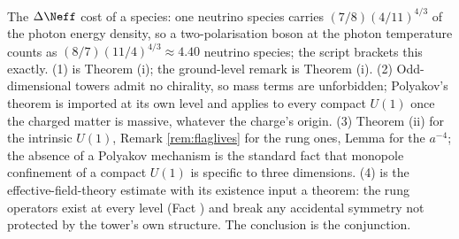 The $\Delta\Neff$ cost of a species: one neutrino species carries $(7/8)(4/11)^{4/3}$ of the photon energy density, so a two-polarisation boson at the photon temperature counts as $(8/7)(11/4)^{4/3} \approx 4.40$ neutrino species; the script brackets this exactly. (1) is Theorem (i); the ground-level remark is Theorem (i). (2) Odd-dimensional towers admit no chirality, so mass terms are unforbidden; Polyakov's theorem is imported at its own level and applies to every compact $U(1)$ once the charged matter is massive, whatever the charge's origin. (3) Theorem (ii) for the intrinsic $U(1)$, Remark \ref{rem:flaglives} for the rung ones, Lemma  for the $a^{-4}$; the absence of a Polyakov mechanism is the standard fact that monopole confinement of a compact $U(1)$ is specific to three dimensions. (4) is the effective-field-theory estimate with its existence input a theorem: the rung operators exist at every level (Fact ) and break any accidental symmetry not protected by the tower's own structure. The conclusion is the conjunction.
